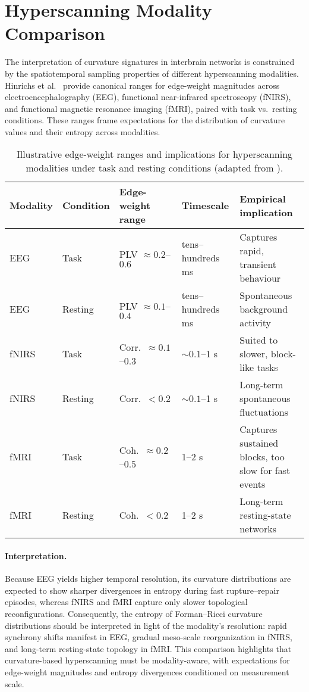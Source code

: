 \documentclass{article}
\theoremstyle{definition}
\begin{document}
\section{Hyperscanning Modality Comparison}

The interpretation of curvature signatures in interbrain networks is constrained
by the spatiotemporal sampling properties of different hyperscanning modalities.
Hinrichs et al.~\citep{hinrichs2025geometry} provide canonical ranges for
edge-weight magnitudes across electroencephalography (EEG), functional near-infrared
spectroscopy (fNIRS), and functional magnetic resonance imaging (fMRI), paired
with task vs.\ resting conditions. These ranges frame expectations for the
distribution of curvature values and their entropy across modalities.

\begin{table}[H]
\centering
\caption{Illustrative edge-weight ranges and implications for hyperscanning modalities under task and resting conditions (adapted from \citet{hinrichs2025geometry}).}
\label{tab:modality-comparison}
\begin{tabularx}{\textwidth}{@{}p{1.5cm} p{1.8cm} p{2.5cm} p{2cm} X@{}}
\toprule
\textbf{Modality} & \textbf{Condition} & \textbf{Edge-weight range} & \textbf{Timescale} & \textbf{Empirical implication} \\
\midrule
EEG   & Task    & PLV $\approx 0.2$--$0.6$ & tens--hundreds ms & Captures rapid, transient behaviour \\
EEG   & Resting & PLV $\approx 0.1$--$0.4$ & tens--hundreds ms & Spontaneous background activity \\
\addlinespace
fNIRS & Task    & Corr.\ $\approx 0.1$--$0.3$ & $\sim 0.1$--1 s & Suited to slower, block-like tasks \\
fNIRS & Resting & Corr.\ $< 0.2$ & $\sim 0.1$--1 s & Long-term spontaneous fluctuations \\
\addlinespace
fMRI  & Task    & Coh.\ $\approx 0.2$--$0.5$ & 1--2 s & Captures sustained blocks, too slow for fast events \\
fMRI  & Resting & Coh.\ $< 0.2$ & 1--2 s & Long-term resting-state networks \\
\bottomrule
\end{tabularx}
\end{table}

\paragraph{Interpretation.}
Because EEG yields higher temporal resolution, its curvature distributions are
expected to show sharper divergences in entropy during fast rupture--repair
episodes, whereas fNIRS and fMRI capture only slower topological reconfigurations.
Consequently, the entropy of Forman--Ricci curvature distributions should be
interpreted in light of the modality’s resolution: rapid synchrony shifts
manifest in EEG, gradual meso-scale reorganization in fNIRS, and long-term
resting-state topology in fMRI. This comparison highlights that curvature-based
hyperscanning must be modality-aware, with expectations for edge-weight
magnitudes and entropy divergences conditioned on measurement scale.
\end{document}

